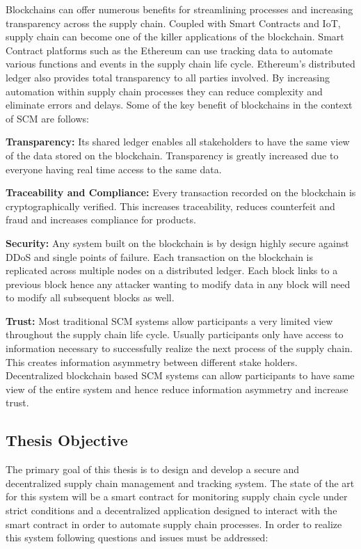 Blockchains can offer numerous benefits for streamlining processes and increasing transparency across the supply chain. Coupled with Smart Contracts and IoT, supply chain can become one of the killer applications of the blockchain. Smart Contract platforms such as the Ethereum can use tracking data to automate various functions and events in the supply chain life cycle. Ethereum’s distributed ledger also provides total transparency to all parties involved. By increasing automation within supply chain processes they can reduce complexity and eliminate errors and delays. Some of the key benefit of blockchains in the context of SCM are follows:

\textbf{Transparency:}
Its shared ledger enables all stakeholders to have the same view of the data stored on the blockchain. Transparency is greatly increased due to everyone having real time access to the same data.

\textbf{Traceability and Compliance:}
Every transaction recorded on the blockchain is cryptographically verified. This increases traceability, reduces counterfeit and fraud and increases compliance for products. 

\textbf{Security:}
Any system built on the blockchain is by design highly secure against DDoS and single points of failure. Each transaction on the blockchain is replicated across multiple nodes on a distributed ledger. Each block links to a previous block hence any attacker wanting to modify data in any block will need to modify all subsequent blocks as well.

\textbf{Trust:}
Most traditional SCM systems allow participants a very limited view throughout the supply chain life cycle. Usually participants only have access to information necessary to successfully realize the next process of the supply chain. This creates information asymmetry between different stake holders. Decentralized blockchain based SCM systems can allow participants to have same view of the entire system and hence reduce information asymmetry and increase trust.
\clearpage
\subsection{Thesis Objective}
The primary goal of this thesis is to design and develop a secure and decentralized supply chain management and tracking system. The state of the art for this system will be a smart contract for monitoring supply chain cycle under strict conditions and a decentralized application designed to interact with the smart contract in order to automate supply chain processes. In order to realize this system following questions and issues must be addressed:

